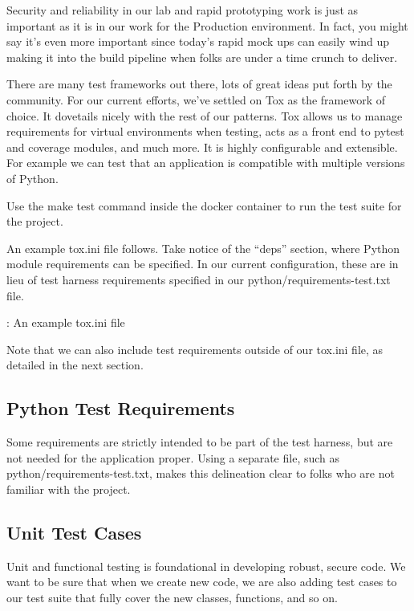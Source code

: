 \justifying
Security and reliability in our lab and rapid prototyping work is just as important as it is in our work for the Production environment. 
In fact, you might say it's even more important since today's rapid mock ups
can easily wind up making it into the build pipeline when folks are under a time crunch to deliver.

\justifying
There are many test frameworks out there, lots of great ideas put forth by the community. For our current
efforts, we've settled on Tox as the framework of choice. It dovetails nicely with the rest of
our patterns. Tox allows us to manage requirements for virtual environments when testing, acts as a front
end to pytest and coverage modules, and much more. It is highly configurable and extensible. For example
we can test that an application is compatible with multiple versions of Python.

\justifying
Use the make test command inside the docker container to run the test suite for the project.

\justifying
An example tox.ini file follows. Take notice of the ``deps'' section,
where Python module requirements can be specified. In our current configuration,
these are in lieu of test harness requirements specified in our
python/requirements-test.txt file.

\begin{mybox}{\thetcbcounter: An example tox.ini file}
	
\end{mybox}

\justifying
Note that we can also include test requirements outside of our tox.ini file, as detailed in the next section.

\subsection{Python Test Requirements}

\justifying
Some requirements are strictly intended to be part of the test harness, but are not
needed for the application proper. Using a separate file, such as
python/requirements-test.txt, makes this delineation clear to folks who are not familiar with the project.

\subsection{Unit Test Cases}

\justifying
Unit and functional testing is foundational in developing robust, secure
code. We want to be sure that when we create new code, we are also adding
test cases to our test suite that fully cover the new classes, functions, and so on.

